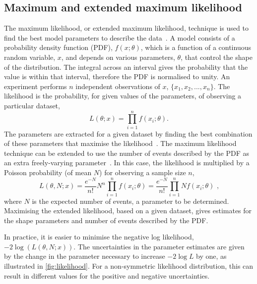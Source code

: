 \subsection{Maximum and extended maximum likelihood}
\label{sec:massfit:likelihood}

The maximum likelihood, or extended maximum likelihood, technique is used to find the best model parameters to describe the data~\cite{MLandEML,EML}. A model consists of a probability density function (PDF), $f(x;\theta)$, which is a function of a continuous random variable, $x$, and depends on various parameters, $\theta$, that control the shape of the distribution. The integral across an interval gives the probability that the value is within that interval, therefore the PDF is normalised to unity. An experiment performs $n$ independent observations of $x$, $\{x_1, x_2, ..., x_n\}$. The likelihood is the probability, for given values of the parameters, of observing a particular dataset,
\begin{equation}
L(\theta;x) = \prod_{i=1}^{n} f(x_i;\theta).
\end{equation}
The parameters are extracted for a given dataset by finding the best combination of these parameters that maximise the likelihood~\cite{MLandEML}. The maximum likelihood technique can be extended to use the number of events described by the PDF as an extra freely-varying parameter~\cite{EML}. In this case, the likelihood is multiplied by a Poisson probability (of mean $N$) for observing a sample size $n$,
\begin{equation}
L(\theta, N;x) = \frac{e^{-N}}{n!}N^n \prod_{i=1}^{n} f(x_i;\theta) = \frac{e^{-N}}{n!} \prod_{i=1}^{n} N f(x_i;\theta) \text{ ,}
\end{equation}
where $N$ is the expected number of events, a parameter to be determined. Maximising the extended likelihood, based on a given dataset, gives estimates for the shape parameters and number of events described by the PDF.

In practice, it is easier to minimise the negative log likelihood, $-2\log(L(\theta, N;x))$. The uncertainties in the parameter estimates are given by the change in the parameter necessary to increase $-2\log L$ by one, as illustrated in \fig\ref{fig:likelihood}. For a non-symmetric likelihood distribution, this can result in different values for the positive and negative uncertainties. 

